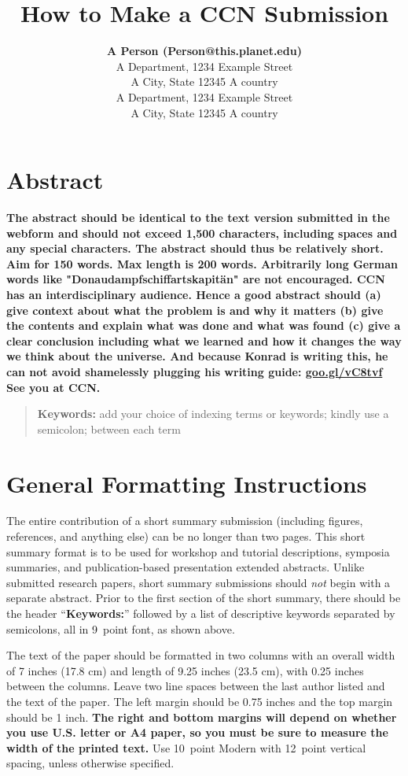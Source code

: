 \documentclass[10pt,letterpaper]{article}
\title{How to Make a CCN Submission}
\author{{\large \bf A Person (Person@this.planet.edu)} \\
  A Department, 1234 Example Street\\
A City, State 12345 A country
  \AND {\large \bf Another Person (AnotherPerson@this.planet.edu)} \\
  A Department, 1234 Example Street\\
A City, State 12345 A country}
\begin{document}
\maketitle


\section{Abstract}
{
\bf
The abstract should be identical to the text version submitted in the webform and should not exceed 1,500 characters, including spaces and any special characters. The abstract should thus be relatively short. Aim for 150 words.
Max length is 200 words. Arbitrarily long German words like "Donaudampfschiffartskapit\"an" are not encouraged.
CCN has an interdisciplinary audience. Hence a good abstract should
(a) give context about what the problem is and why it matters 
(b) give the contents and explain what was done and what was found
(c) give a clear conclusion including what we learned and how it changes 
the way we think about the universe.
And because Konrad is writing this, he can not avoid shamelessly plugging
his writing guide:
\url{goo.gl/vC8tvf} See you at CCN.
}
\begin{quote}
\small
\textbf{Keywords:} 
add your choice of indexing terms or keywords; kindly use a
semicolon; between each term
\end{quote}

\section{General Formatting Instructions}

The entire contribution of a short summary submission (including
figures, references, and anything else) can be no longer than two
pages. This short summary format is to be used for workshop and
tutorial descriptions, symposia summaries, and publication-based
presentation extended abstracts. Unlike submitted research papers,
short summary submissions should \emph{not} begin with a separate
abstract. Prior to the first section of the short summary, there
should be the header ``{\bf Keywords:}'' followed by a list of
descriptive keywords separated by semicolons, all in 9~point font, as
shown above.

The text of the paper should be formatted in two columns with an
overall width of 7 inches (17.8 cm) and length of 9.25 inches (23.5
cm), with 0.25 inches between the columns. Leave two line spaces
between the last author listed and the text of the paper. The left
margin should be 0.75 inches and the top margin should be 1 inch.
\textbf{The right and bottom margins will depend on whether you use
  U.S. letter or A4 paper, so you must be sure to measure the width of
  the printed text.} Use 10~point Modern with 12~point vertical
spacing, unless otherwise specified.
\end{document}
